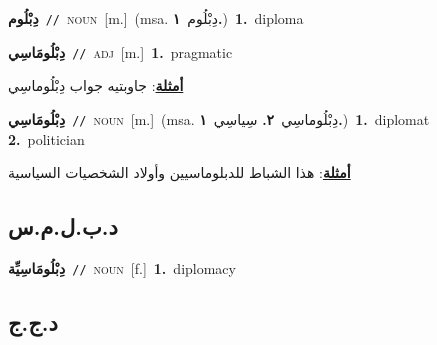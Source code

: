 \documentclass[10pt,a4paper,twoside]{article} %
\begin{document}
\begin{multicols}{2}
{\setlength\topsep{0pt}\textbf{\foreignlanguage{arabic}{دِبْلُوم}}\ {\color{gray}\texttt{//}\color{black}}\ \textsc{noun}\ [m.]\ \color{gray}(msa. \foreignlanguage{arabic}{دِبْلُوم}~\foreignlanguage{arabic}{\textbf{١.}})\color{black}\ \textbf{1.}~diploma\ } \vspace{2mm}

{\setlength\topsep{0pt}\textbf{\foreignlanguage{arabic}{دِبْلُومَاسِي}}\ {\color{gray}\texttt{//}\color{black}}\ \textsc{adj}\ [m.]\ \textbf{1.}~pragmatic\  \begin{flushright}\color{gray}\foreignlanguage{arabic}{\textbf{\underline{\foreignlanguage{arabic}{أمثلة}}}: جاوبتيه جواب دِبْلُوماسِي}\end{flushright}\color{black}} \vspace{2mm}

{\setlength\topsep{0pt}\textbf{\foreignlanguage{arabic}{دِبْلُومَاسِي}}\ {\color{gray}\texttt{//}\color{black}}\ \textsc{noun}\ [m.]\ \color{gray}(msa. \foreignlanguage{arabic}{دِبْلُوماسِي}~\foreignlanguage{arabic}{\textbf{٢.}}  \foreignlanguage{arabic}{سِياسِي}~\foreignlanguage{arabic}{\textbf{١.}})\color{black}\ \textbf{1.}~diplomat  \textbf{2.}~politician\  \begin{flushright}\color{gray}\foreignlanguage{arabic}{\textbf{\underline{\foreignlanguage{arabic}{أمثلة}}}: هذا الشباط للدبلوماسيين وأولاد الشخصيات السياسية}\end{flushright}\color{black}} \vspace{2mm}

\vspace{-3mm}
\subsection*{\color{blue}\foreignlanguage{arabic}{د.ب.ل.م.س}\color{blue}{ (ntws)}} 

{\setlength\topsep{0pt}\textbf{\foreignlanguage{arabic}{دِبْلُومَاسِيِّة}}\ {\color{gray}\texttt{//}\color{black}}\ \textsc{noun}\ [f.]\ \textbf{1.}~diplomacy\ } \vspace{2mm}

\vspace{-3mm}
\subsection*{\color{blue}\foreignlanguage{arabic}{د.ج.ج}\color{blue}{}} 


\end{multicols}
\end{document}
